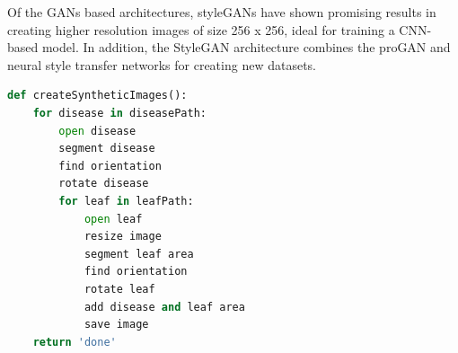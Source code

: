 Of the GANs based architectures, styleGANs have shown promising results in creating higher resolution images of size 256 x 256, ideal for training a CNN-based model. In addition, the StyleGAN architecture combines the proGAN and neural style transfer networks for creating new datasets.

\newpage
\begin{lstlisting}[language=Python, label={lst:code}, caption=Pseudo code for generating synthetic disease images.]
def createSyntheticImages():
    for disease in diseasePath:
        open disease
        segment disease
        find orientation
        rotate disease
        for leaf in leafPath:
            open leaf
            resize image
            segment leaf area
            find orientation
            rotate leaf
            add disease and leaf area
            save image
    return 'done'
\end{lstlisting}


